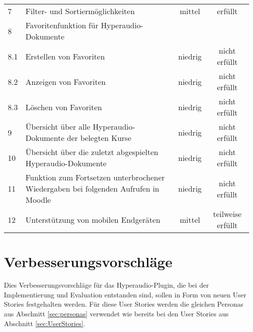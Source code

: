 \begin{table}[!ht]
\begin{tabularx}{\textwidth}{lXcc}
   	7 & Filter- und Sortiermöglichkeiten & mittel & erfüllt\\
    8 & Favoritenfunktion für Hyperaudio-Dokumente & & \\
    8.1 & \hspace*{0.5cm} Erstellen von Favoriten & niedrig & nicht erfüllt\\
    8.2 & \hspace*{0.5cm} Anzeigen von Favoriten & niedrig & nicht erfüllt\\
    8.3 & \hspace*{0.5cm} Löschen von Favoriten & niedrig & nicht erfüllt\\    
    9 & Übersicht über alle Hyperaudio-Dokumente der belegten Kurse & niedrig & nicht erfüllt\\
    10 & Übersicht über die zuletzt abgespielten Hyperaudio-Dokumente & niedrig & nicht erfüllt\\
    11 &  Funktion zum Fortsetzen unterbrochener Wiedergaben bei folgenden Aufrufen in Moodle & niedrig & nicht erfüllt\\
    12 & Unterstützung von mobilen Endgeräten & mittel & teilweise erfüllt\\
    \hline
\end{tabularx}
\end{table}
\FloatBarrier
\section{Verbesserungsvorschläge}
Dies Verbesserungsvorschläge für das Hyperaudio-Plugin, die bei der Implementierung und Evaluation entstanden sind,  sollen in Form von neuen User Stories festgehalten werden. Für diese User Stories werden die gleichen Personas aus Abschnitt \ref{sec:personas} verwendet wie bereits bei den User Stories aus Abschnitt \ref{sec:UserStories}.

